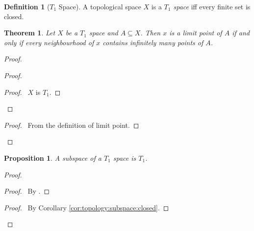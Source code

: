 \documentclass{report}
\let\qed\relax
\newtheorem{prop}[lm]{Proposition}
\newtheorem{thm}[lm]{Theorem}
\theoremstyle{definition}
\newtheorem{df}[lm]{Definition}
\begin{document}
  \begin{df}[$T_1$ Space]
    A topological space $X$ is a \emph{$T_1$ space} iff every finite set is
    closed.
  \end{df}

  \begin{thm}
    \label{thm:topology:T1:limit_point}
    Let $X$ be a $T_1$ space and $A \subseteq X$. Then $x$ is a limit point of
    $A$
    if and only if every neighbourhood of $x$ contains infinitely many points
    of
    $A$.
  \end{thm}

  \begin{proof}
    \pf
    \begin{proof}
      \begin{proof}
        \pf\ $X$ is $T_1$.
      \end{proof}
    \end{proof}
    \begin{proof}
      \pf\ From the definition of limit point.
    \end{proof}
    \qed
  \end{proof}

    \begin{prop}
    \label{prop:topology:T1:subspace}
   A subspace of a $T_1$ space is $T_1$.
  \end{prop}

  \begin{proof}
   \pf
   \begin{proof}
     \pf\ By .
   \end{proof}
   \begin{proof}
     \pf\ By Corollary \ref{cor:topology:subspace:closed}.
   \end{proof}
   \qed
  \end{proof}
\end{document}
